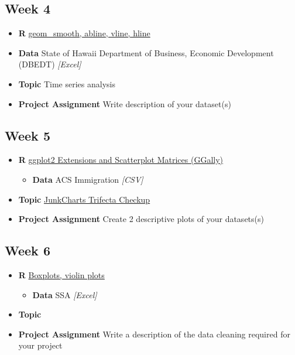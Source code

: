 \documentclass[]{book}
\providecommand{\tightlist}{%
  \setlength{\itemsep}{0pt}\setlength{\parskip}{0pt}}
\theoremstyle{definition}
\theoremstyle{definition}
\theoremstyle{remark}
\begin{document}
\subsection*{Week 4}\label{week-4}

\begin{itemize}
\tightlist
\item
  \textbf{R} \protect\hyperlink{lines}{geom\_smooth, abline, vline,
  hline}
\item
  \textbf{Data} State of Hawaii Department of Business, Economic
  Development (DBEDT) \emph{{[}Excel{]}}
\item
  \textbf{Topic} Time series analysis 
\item
  \textbf{Project Assignment} Write description of your dataset(s)
\end{itemize}

\subsection*{Week 5}\label{week-5}

\begin{itemize}
\tightlist
\item
  \textbf{R} \protect\hyperlink{ggplot-exts}{ggplot2 Extensions and
  Scatterplot Matrices (GGally)}

  \begin{itemize}
  \tightlist
  \item
    \textbf{Data} ACS Immigration \emph{{[}CSV{]}}
  \end{itemize}
\item
  \textbf{Topic} \protect\hyperlink{trifecta}{JunkCharts Trifecta
  Checkup}
\item
  \textbf{Project Assignment} Create 2 descriptive plots of your
  datasets(s)
\end{itemize}

\subsection*{Week 6}\label{week-6}

\begin{itemize}
\tightlist
\item
  \textbf{R} \protect\hyperlink{boxplots-and-violins}{Boxplots, violin
  plots}

  \begin{itemize}
  \tightlist
  \item
    \textbf{Data} SSA \emph{{[}Excel{]}}
  \end{itemize}
\item
  \textbf{Topic}
\item
  \textbf{Project Assignment} Write a description of the data cleaning
  required for your project
\end{itemize}
\end{document}
